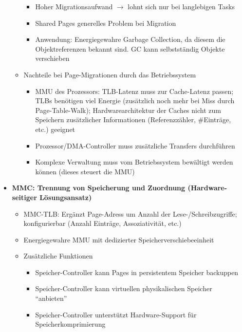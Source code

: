 \begin{itemize}
\begin{itemize}
\begin{itemize}
			\item Hoher Migrationsaufwand \(\rightarrow\) lohnt sich nur bei langlebigen Tasks
			\item Shared Pages generelles Problem bei Migration
			\item Anwendung: Energiegewahre Garbage Collection, da diesem die Objektreferenzen bekannt sind. GC kann selbstständig Objekte verschieben
		\end{itemize}
		\item Nachteile bei Page-Migrationen durch das Betriebssystem
		\begin{itemize}
			\item MMU des Prozessors: TLB-Latenz muss zur Cache-Latenz passen; TLBs benötigen viel Energie (zusätzlich noch mehr bei Miss durch Page-Table-Walk); Hardwarearchitektur der Caches nicht zum Speichern zusätzlicher Informationen (Referenzzähler, \#Einträge, etc.) geeignet
			\item Prozessor/DMA-Controller muss zusätzliche Transfers durchführen
			\item Komplexe Verwaltung muss vom Betriebssystem bewältigt werden können (dieses steuert die MMU)
		\end{itemize}
	\end{itemize}
	\item \textbf{MMC: Trennung von Speicherung und Zuordnung (Hardware-seitiger Lösungsansatz)}
	\begin{itemize}
		\item MMC-TLB: Ergänzt Page-Adress um Anzahl der Lese-/Schreibzugriffe; konfigurierbar (Anzahl Einträge, Assoziativität, etc.)
		\item Energiegewahre MMU mit dedizierter Speicherverschiebeeinheit
		\item Zusätzliche Funktionen
		\begin{itemize}
			\item Speicher-Controller kann Pages in persistentem Speicher backuppen
			\item Speicher-Controller kann virtuellen physikalischen Speicher "`anbieten"'
			\item Speicher-Controller unterstützt Hardware-Support für Speicherkomprimierung
		\end{itemize}
	\end{itemize}
\end{itemize}


